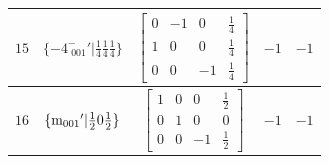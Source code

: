 \documentclass[fleqn,8pt]{jsarticle}
\begin{document}
\begin{longtable}{ccccc}
$ 15 $ & $ \{-4^{-}_{\,\,001}{}'|\frac{1}{4} \frac{1}{4} \frac{1}{4}\} $ & $ \begin{bmatrix} 0 & -1 & 0 & \frac{1}{4} \\ 1 & 0 & 0 & \frac{1}{4} \\ 0 & 0 & -1 & \frac{1}{4} \end{bmatrix} $ & $ -1 $ & $ -1 $ \\ \hline
$ 16 $ & $ \{{\rm m}_{001}{}'|\frac{1}{2} 0 \frac{1}{2}\} $ & $ \begin{bmatrix} 1 & 0 & 0 & \frac{1}{2} \\ 0 & 1 & 0 & 0 \\ 0 & 0 & -1 & \frac{1}{2} \end{bmatrix} $ & $ -1 $ & $ -1 $ \\
\end{longtable}
\end{document}
